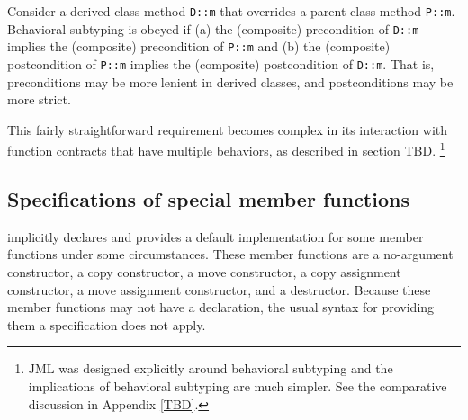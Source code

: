 Consider a derived class method \lstinline|D::m| that overrides a parent class method \lstinline|P::m|.
Behavioral subtyping is obeyed if (a) the (composite) precondition of
\lstinline|D::m| implies the (composite) precondition of 
\lstinline|P::m| and (b) the (composite) postcondition of
\lstinline|P::m| implies the (composite) postcondition of 
\lstinline|D::m|. That is, preconditions may be more lenient in derived classes, and postconditions may be more strict. 

This fairly straightforward requirement becomes complex in its interaction with function contracts that have multiple behaviors, 
as described in section TBD.
\footnote{JML was designed explicitly around behavioral subtyping and the implications of behavioral subtyping are much simpler. 
	See the comparative discussion in Appendix \ref{TBD}.}


\subsection{Specifications of special member functions}

\lang{} implicitly declares and provides a default implementation for some member functions under some circumstances. These member functions are a no-argument constructor, a copy constructor, a move constructor, a copy assignment constructor, a move assignment constructor, and a destructor. Because these member functions may not have a declaration, the usual syntax for providing them
a specification does not apply.
